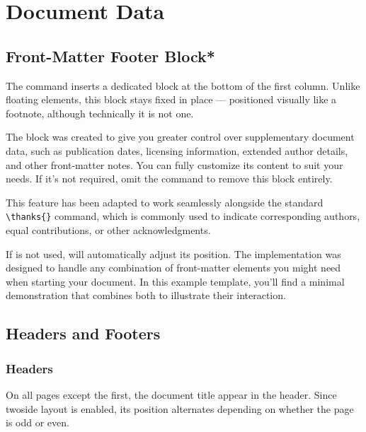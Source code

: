 
\section{Document Data}

    \subsection{Front-Matter Footer Block*}

        The \inlinecode{\docinfo{}} command inserts a dedicated block at the bottom of the first column. Unlike floating elements, this block stays fixed in place — positioned visually like a footnote, although technically it is not one.
    
        The \inlinecode{\docinfo{}} block was created to give you greater control over supplementary document data, such as publication dates, licensing information, extended author details, and other front-matter notes. You can fully customize its content to suit your needs. If it’s not required, omit the command to remove this block entirely.
    
        \begin{note}
            This feature has been adapted to work seamlessly alongside the standard \verb|\thanks{}| command, which is commonly used to indicate corresponding authors, equal contributions, or other acknowledgments.
        \end{note}
    
        If \inlinecode{\thanks{}} is not used, \inlinecode{\docinfo{}} will automatically adjust its position. The implementation was designed to handle any combination of front-matter elements you might need when starting your document. In this example template, you’ll find a minimal demonstration that combines both to illustrate their interaction.

    \subsection{Headers and Footers}

        \subsubsection{Headers}

            On all pages except the first, the document title appear in the header. Since twoside layout is enabled, its position alternates depending on whether the page is odd or even.

